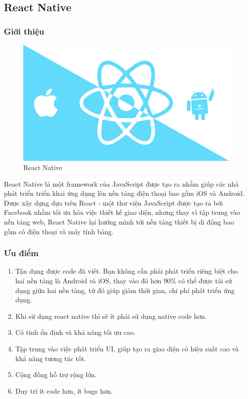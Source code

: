 \subsection{React Native}
    \subsubsection{Giới thiệu}
        \begin{figure}[h]
            \centering
            \includegraphics[width=0.9\linewidth]{images/appropriate framework/react-native.png}
            \caption{React Native}
        \end{figure}
        React Native là một framework của JavaScript được tạo ra  nhằm giúp các nhà phát triển triển khai ứng dụng lên nền tảng điện thoại bao gồm iOS và Android. Được xây dựng dựa trên React - một thư viện JavaScript được tạo ra bởi Facebook nhằm tối ưu hóa việc thiết kế giao diện, nhưng thay vì tập trung vào nền tảng web, React Native lại hướng mình tới nền tảng thiết bị di động bao gồm có điện thoại và máy tính bảng.
    
    \subsubsection{Ưu điểm}
        \begin{enumerate}
            \item Tận dụng được code đã viết. Bạn không cần phải phát triển riêng biệt cho hai nền tảng là Android và iOS, thay vào đó hơn 90\% có thể được tái sử dụng giữa hai nền tảng, từ đó giúp giảm thời gian, chi phí phát triển ứng dụng.
            \item Khi sử dụng react native thì sẽ ít phải sử dụng native code hơn.
            \item Có tính ổn định và khả năng tối ưu cao.
            \item Tập trung vào việc phát triển UI, giúp tạo ra giao diện có hiệu suất cao và khả năng tương tác tốt.
            \item Cộng đồng hỗ trợ rộng lớn.
            \item Duy trì ít code hơn, ít bugs hơn.
        \end{enumerate}
